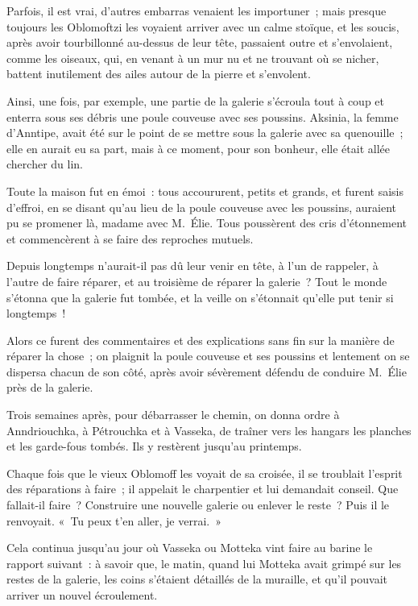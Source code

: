 \documentclass[french,twoside]{book} %
\begin{document}
Parfois, il est vrai, d’autres embarras venaient les importuner ; mais presque toujours les Oblomoftzi les voyaient arriver avec un calme stoïque, et les soucis, après avoir tourbillonné au-dessus de leur tête, passaient outre et s’envolaient, comme les oiseaux, qui, en venant à un mur nu et ne trouvant où se nicher, battent inutilement des ailes autour de la pierre et s’envolent.\par
Ainsi, une fois, par exemple, une partie de la galerie s’écroula tout à coup et enterra sous ses débris une poule couveuse avec ses poussins. Aksinia, la femme d’Anntipe, avait été sur le point de se mettre sous la galerie avec sa quenouille ; elle en aurait eu sa part, mais à ce moment, pour son bonheur, elle était allée chercher du lin.\par
Toute la maison fut en émoi : tous accoururent, petits et grands, et furent saisis d’effroi, en se disant qu’au lieu de la poule couveuse avec les poussins, auraient pu se promener là, madame avec M. Élie. Tous poussèrent des cris d’étonnement et commencèrent à se faire des reproches mutuels.\par
Depuis longtemps n’aurait-il pas dû leur venir en tête, à l’un de rappeler, à l’autre de faire réparer, et au troisième de réparer la galerie ? Tout le monde s’étonna que la galerie fut tombée, et la veille on s’étonnait qu’elle put tenir si longtemps !\par
Alors ce furent des commentaires et des explications sans fin sur la manière de réparer la chose ; on plaignit la poule couveuse et ses poussins et lentement on se dispersa chacun de son côté, après avoir sévèrement défendu de conduire M. Élie près de la galerie.\par
Trois semaines après, pour débarrasser le chemin, on donna ordre à Anndriouchka, à Pétrouchka et à Vasseka, de traîner vers les hangars les planches et les garde-fous tombés. Ils y restèrent jusqu’au printemps.\par
Chaque fois que le vieux Oblomoff les voyait de sa croisée, il se troublait l’esprit des réparations à faire ; il appelait le charpentier et lui demandait conseil. Que fallait-il faire ? Construire une nouvelle galerie ou enlever le reste ? Puis il le renvoyait. « Tu peux t’en aller, je verrai. »\par
Cela continua jusqu’au jour où Vasseka ou Motteka vint faire au barine le rapport suivant : à savoir que, le matin, quand lui Motteka avait grimpé sur les restes de la galerie, les coins s’étaient détaillés de la muraille, et qu’il pouvait arriver un nouvel écroulement.\par
\end{document}
